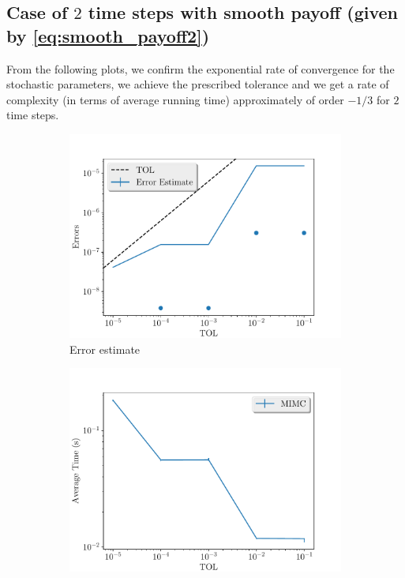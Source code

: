 \documentclass[11pt]{article}
\begin{document}
\subsection{Case of $2$ time steps with smooth payoff (given by \eqref{eq:smooth_payoff2})}

From the following plots, we confirm the exponential rate of convergence for the stochastic parameters, we achieve the prescribed tolerance and  we get a rate of complexity (in terms of average running time) approximately of order $-1/3$ for $2$ time steps.

\begin{figure}[!h]
	\centering
	\begin{subfigure}{.5\textwidth}
		\centering
		\includegraphics[width=1\linewidth]{./figures/1D_BS_2_steps_smooth_second_payoff_eps_10_5/error_estimate.pdf}
		\caption{Error estimate}
		\label{fig:misc_1D_BS_2_steps_smooth_second_payoff_eps_10_5_sub1}
	\end{subfigure}%
	\begin{subfigure}{.5\textwidth}
		\centering
		\includegraphics[width=1\linewidth]{./figures/1D_BS_2_steps_smooth_second_payoff_eps_10_5/average_running_time.pdf}

\end{subfigure}
\end{figure}
\end{document}
